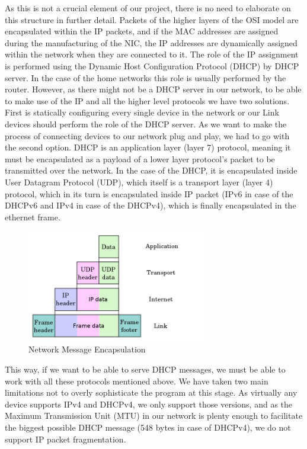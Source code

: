 As this is not a crucial element of our project, there is no need to elaborate on this structure in further detail.
Packets of the higher layers of the OSI model are encapsulated within the IP packets, and if the MAC addresses are assigned during the manufacturing of the NIC, the IP addresses are dynamically assigned within the network when they are connected to it. The role of the IP assignment is performed using the Dynamic Host Configuration Protocol (DHCP) by DHCP server. In the case of the home networks this role is usually performed by the router. However, as there might not be a DHCP server in our network,  to be able to make use of the IP and all the higher level protocols we have two solutions. First is statically configuring every single device in the network or our Link devices should perform the role of the DHCP server. As we want to make the process of connecting devices to our network plug and play, we had to go with the second option. DHCP is an application layer (layer 7) protocol, meaning it must be encapsulated as a payload of a lower layer protocol’s packet to be transmitted over the network. In the case of the DHCP, it is encapsulated inside User Datagram Protocol (UDP), which itself is a transport layer (layer 4) protocol, which in its turn is encapsulated inside IP packet (IPv6 in case of the DHCPv6 and IPv4 in case of the DHCPv4), which is finally encapsulated in the ethernet frame. 

\begin{figure}[htp]
\begin{center}
\includegraphics[width=0.7\textwidth]{UDP-encapsulation}
\end{center}
\caption{Network Message Encapsulation}
\label{ethernet-port}
\end{figure}

This way, if we want to be able to serve DHCP messages, we must be able to work with all these protocols mentioned above. We have taken two main limitations not to overly sophisticate the program at this stage. As virtually any device supports IPv4 and DHCPv4, we only support those versions, and as the Maximum Transmission Unit (MTU) in our network is plenty enough to facilitate the biggest possible DHCP message (548 bytes in case of DHCPv4), we do not support IP packet fragmentation.

